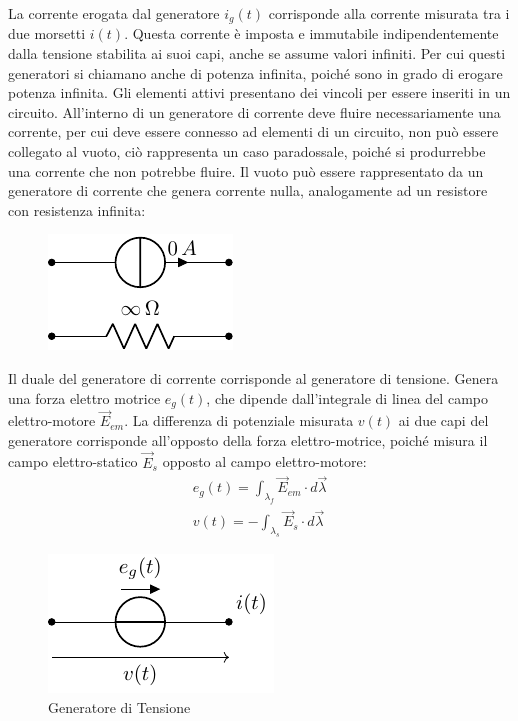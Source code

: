 \documentclass{article}
\numberwithin{equation}{subsection}
\begin{document}
La corrente erogata dal generatore $i_g(t)$ corrisponde alla corrente misurata tra i due morsetti $i(t)$. Questa corrente è imposta e immutabile indipendentemente dalla tensione 
stabilita ai suoi capi, anche se assume valori infiniti. Per cui questi generatori si chiamano anche di potenza infinita, poiché sono in grado di erogare potenza infinita. 
Gli elementi attivi presentano dei vincoli per essere inseriti in un circuito. All'interno di un generatore di corrente deve fluire necessariamente una corrente, per cui deve 
essere connesso ad elementi di un circuito, non può essere collegato al vuoto, ciò rappresenta un caso paradossale, poiché si produrrebbe una corrente che non potrebbe fluire. 
Il vuoto può essere rappresentato da un generatore di corrente che genera corrente nulla, analogamente ad un resistore con resistenza infinita: 
\begin{figure}[H]%
    \centering
    \includegraphics{vuoto.pdf}
    \label{fig:vuoto}
\end{figure}


Il duale del generatore di corrente corrisponde al generatore di tensione. Genera una forza elettro motrice $e_g(t)$, che dipende dall'integrale di linea del campo 
elettro-motore $\vec{E}_{em}$. La differenza di potenziale misurata $v(t)$ ai due capi del generatore corrisponde all'opposto della forza elettro-motrice, poiché misura il 
campo elettro-statico $\vec{E}_s$ opposto al campo elettro-motore: 
\begin{gather*}
    e_g(t)=\displaystyle\int_{\lambda_f}\vec{E}_{em}\cdot d\vec{\lambda}\\
    v(t)=-\displaystyle\int_{\lambda_s}\vec{E}_s\cdot d\vec{\lambda}
\end{gather*}
\begin{figure}[H]%
    \centering
    \includegraphics{generatore-tensione.pdf}
    \caption{Generatore di Tensione}
    \label{fig:generatore-tensione}
\end{figure}
\end{document}
